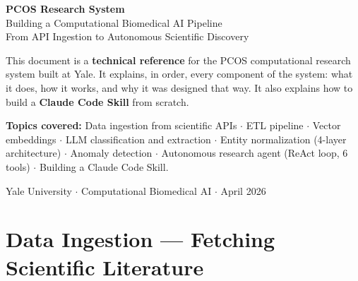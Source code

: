 \documentclass[11pt,a4paper]{article}
\begin{document}
\thispagestyle{empty}


\vspace*{1.2cm}
{\color{white}\fontsize{28}{34}\selectfont\bfseries PCOS Research System}\\[0.5cm]
{\color{white}\fontsize{15}{20}\selectfont Building a Computational Biomedical AI Pipeline}\\[0.3cm]
{\color{Teal!60!white}\fontsize{11}{14}\selectfont From API Ingestion to Autonomous Scientific Discovery}

\vspace{3.5cm}

\begin{tcolorbox}[colback=GrayLight, colframe=GrayMid!50, boxrule=0.8pt,
  left=14pt, right=14pt, top=10pt, bottom=10pt]
{\normalsize\color{Dark}
This document is a \textbf{technical reference} for the PCOS computational
research system built at Yale. It explains, in order, every component of the
system: what it does, how it works, and why it was designed that way. It also
explains how to build a \textbf{Claude Code Skill} from scratch.

\vspace{6pt}
\textbf{Topics covered:} Data ingestion from scientific APIs $\cdot$
ETL pipeline $\cdot$ Vector embeddings $\cdot$ LLM classification and extraction $\cdot$
Entity normalization (4-layer architecture) $\cdot$ Anomaly detection $\cdot$
Autonomous research agent (ReAct loop, 6 tools) $\cdot$ Building a Claude Code Skill.
}
\end{tcolorbox}

\vspace{0.8cm}
{\small\color{GrayMid} Yale University $\cdot$ Computational Biomedical AI $\cdot$ April 2026}

\newpage
\tableofcontents
\newpage

\section{Data Ingestion --- Fetching Scientific Literature}
\end{document}
